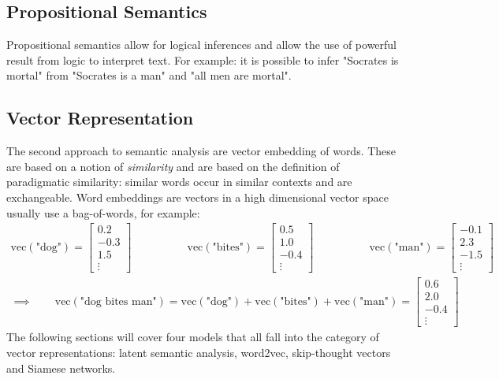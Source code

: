		\subsection{Propositional Semantics}
			Propositional semantics allow for logical inferences and allow the use of powerful result from logic to interpret text. For example: it is possible to infer "Socrates is mortal" from "Socrates is a man" and "all men are mortal".


		\subsection{Vector Representation}
			The second approach to semantic analysis are vector embedding of words. These are based on a notion of \emph{similarity} and are based on the definition of paradigmatic similarity: similar words occur in similar contexts and are exchangeable. Word embeddings are vectors in a high dimensional vector space usually use a bag-of-words, for example:
			\begin{gather}
				\mathrm{vec}(\text{"dog"}) = \begin{bmatrix} 0.2 \\ -0.3 \\ 1.5 \\ \vdots \end{bmatrix} \qquad\qquad\quad
				\mathrm{vec}(\text{"bites"}) = \begin{bmatrix} 0.5 \\ 1.0 \\ -0.4 \\ \vdots \end{bmatrix} \qquad\qquad\quad
				\mathrm{vec}(\text{"man"}) = \begin{bmatrix} -0.1 \\ 2.3 \\ -1.5 \\ \vdots \end{bmatrix} \\
				\implies\qquad
				\mathrm{vec}(\text{"dog bites man"})
					= \mathrm{vec}(\text{"dog"}) + \mathrm{vec}(\text{"bites"}) + \mathrm{vec}(\text{"man"})
					= \begin{bmatrix} 0.6 \\ 2.0 \\ -0.4 \\ \vdots \end{bmatrix}
			\end{gather}
			The following sections will cover four models that all fall into the category of vector representations: latent semantic analysis, word2vec, skip-thought vectors and Siamese networks.

